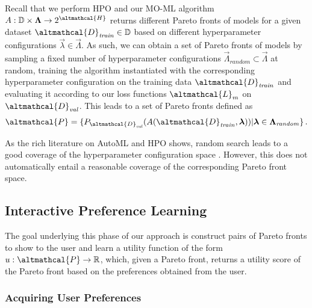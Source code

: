Recall that we perform HPO and our MO-ML algorithm $A: \mathbb{D} \times \vec{\Lambda} \rightarrow 2^\altmathcal{H}$ returns different Pareto fronts of models for a given dataset $\altmathcal{D}_\mathit{train} \in \mathbb{D}$ based on different hyperparameter configurations $\vec{\lambda} \in \vec{\Lambda}$. As such, we can obtain a set of Pareto fronts of models by sampling a fixed number of hyperparameter configurations $\vec{\Lambda}_\mathit{random} \subset \vec{\Lambda}$ at random, training the algorithm instantiated with the corresponding hyperparameter configuration on the training data $\altmathcal{D}_\mathit{train}$ and evaluating it according to our loss functions $\altmathcal{L}_m$ on $\altmathcal{D}_\mathit{val}$. This leads to a set of Pareto fronts defined as
\begin{equation}
    \altmathcal{P} = \{ P_{\altmathcal{D}_\mathit{val}}(A(\altmathcal{D}_\mathit{train}, \vec{\lambda})) \vert \vec{\lambda} \in \vec{\Lambda}_\mathit{random}\} \, .
\end{equation}

As the rich literature on AutoML and HPO shows, random search leads to a good coverage of the hyperparameter configuration space \cite{bischl-dmkd23a}. However, this does not automatically entail a reasonable coverage of the corresponding Pareto front space. 

\subsection{Interactive Preference Learning}
\label{moo-ssec:preference_learning_method}

The goal underlying this phase of our approach is construct pairs of Pareto fronts to show to the user and learn a utility function of the form $u: \altmathcal{P} \rightarrow \mathbb{R}$, which, given a Pareto front, returns a utility score of the Pareto front based on the preferences obtained from the user. 

\subsubsection*{Acquiring User Preferences}

